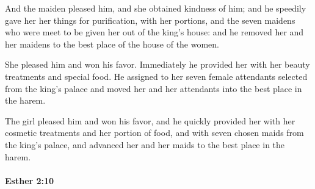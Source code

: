 			\begin{versebox}
					\item[BHS] 
					\item[LXX] 
					\item[ASV] And the maiden pleased him, and she obtained kindness of him; and he speedily gave her her things for purification, with her portions, and the seven maidens who were meet to be given her out of the king's house: and he removed her and her maidens to the best place of the house of the women.
					\item[NIV] She pleased him and won his favor. Immediately he provided her with her beauty treatments and special food. He assigned to her seven female attendants selected from the king’s palace and moved her and her attendants into the best place in the harem.
					\item[NRSV] The girl pleased him and won his favor, and he quickly provided her with her cosmetic treatments and her portion of food, and with seven chosen maids from the king’s palace, and advanced her and her maids to the best place in the harem.
			\end{versebox}

		\paragraph{Esther 2:10} %
			\label{ESTHER-2-10}


